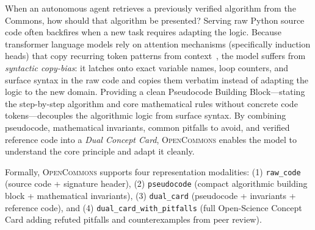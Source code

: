 \documentclass[10pt,twocolumn]{article}
\begin{document}
When an autonomous agent retrieves a previously verified algorithm from the Commons, how should that algorithm be presented? Serving raw Python source code often backfires when a new task requires adapting the logic. Because transformer language models rely on attention mechanisms (specifically induction heads) that copy recurring token patterns from context~\cite{olsson2022context}, the model suffers from \emph{syntactic copy-bias}: it latches onto exact variable names, loop counters, and surface syntax in the raw code and copies them verbatim instead of adapting the logic to the new domain. Providing a clean Pseudocode Building Block---stating the step-by-step algorithm and core mathematical rules without concrete code tokens---decouples the algorithmic logic from surface syntax. By combining pseudocode, mathematical invariants, common pitfalls to avoid, and verified reference code into a \emph{Dual Concept Card}, \textsc{OpenCommons} enables the model to understand the core principle and adapt it cleanly.

Formally, \textsc{OpenCommons} supports four representation modalities: (1) \texttt{raw\_code} (source code + signature header), (2) \texttt{pseudocode} (compact algorithmic building block + mathematical invariants), (3) \texttt{dual\_card} (pseudocode + invariants + reference code), and (4) \texttt{dual\_card\_with\_pitfalls} (full Open-Science Concept Card adding refuted pitfalls and counterexamples from peer review).
\end{document}
